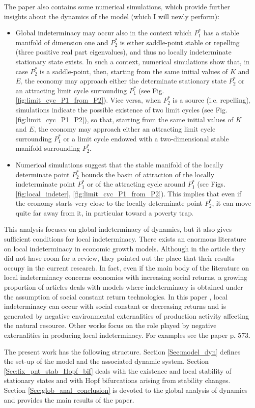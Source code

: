 The paper \cite{antoci_poverty_2011} also contains some numerical simulations, which provide further insights about the dynamics of the model (which I will newly perform):
\begin{itemize}
	\item Global indeterminacy may occur also in the context which $P_1^*$ has a stable manifold of dimension one and $P_2^*$ is either saddle-point stable or repelling (three positive real part eigenvalues), and thus no locally indeterminate stationary state exists. In such a context, numerical simulations show that, in case $P_2^*$ is a saddle-point, then, starting from the same initial values of $K$ and $E$, the economy may approach either the determinate stationary state $P_2^*$ or an attracting limit cycle surrounding $P_1^*$ (see Fig. \ref{fig:limit_cyc_P1_from_P2}). Vice versa, when $P_2^*$ is a source (i.e. repelling), simulations indicate the possible existence of two limit cycles (see Fig. \ref{fig:limit_cyc_P1_P2}), so that, starting from the same initial values of $K$ and $E$, the economy may approach either
	an attracting limit cycle surrounding $P_1^*$ or a limit cycle endowed with a two-dimensional stable manifold surrounding $P_2^*$.
	\item Numerical simulations suggest that the stable manifold of the locally determinate point $P_2^*$ bounds the basin of attraction of the locally indeterminate point $P_1^*$ or of the attracting cycle around $P_1^*$ (see Figs. \ref{fig:local_indeter}, \ref{fig:limit_cyc_P1_from_P2}). This implies that even if the economy starts very close to the locally determinate point $P_2^*$, it can move quite far away from it, in particular toward a poverty trap.
\end{itemize}

This analysis focuses on global indeterminacy of dynamics, but it also gives sufficient conditions for local indeterminacy. There exists an enormous literature on local indeterminacy in economic growth models. Although in the article \cite{antoci_poverty_2011} they did not have room for a review, they pointed out the place that their results occupy in the current research. In fact, even if the main body of the literature on local indeterminacy concerns economies with increasing social returns, a growing proportion of articles deals with models where indeterminacy is obtained under the assumption of social constant return technologies. In this paper \cite{antoci_poverty_2011}, local indeterminacy can occur with social constant or decreasing returns and is generated by negative environmental externalities of production activity affecting the natural resource. Other works focus on the role played by negative externalities in producing local  indeterminacy. For examples see the paper \cite{antoci_poverty_2011} p. 573.

The present work has the following structure. Section \ref{Sec:model_dyn} defines the set-up of the model and the associated dynamic system. Section \ref{Sec:fix_pnt_stab_Hopf_bif} deals with the existence and local stability of stationary states and with Hopf bifurcations arising from stability changes. Section \ref{Sec:glob_anal_conclusion} is devoted to the global analysis of dynamics and provides the main results of the paper. 

